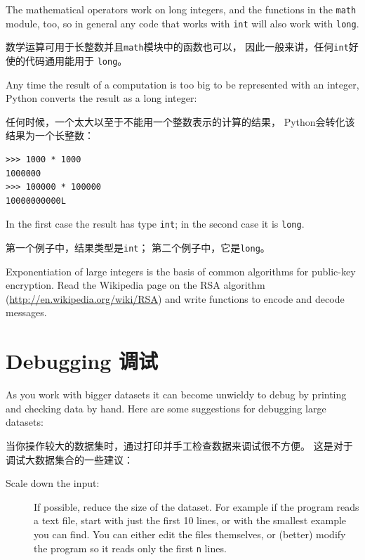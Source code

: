 \documentclass[10pt]{book}
\begin{document}
\begin{CJK}{UTF8}{gbsn}
The mathematical operators work on long integers, and the functions
in the {\tt math} module, too, so in general any code that
works with {\tt int} will also work with {\tt long}.

数学运算可用于长整数并且{\tt math}模块中的函数也可以，
因此一般来讲，任何{\tt int}好使的代码通用能用于 {\tt long}。

Any time the result of a computation is too big to be represented with
an integer, Python converts the result as a long integer:

任何时候，一个太大以至于不能用一个整数表示的计算的结果，
Python会转化该结果为一个长整数：

\begin{verbatim}
>>> 1000 * 1000
1000000
>>> 100000 * 100000
10000000000L
\end{verbatim}
%
In the first case the result has type {\tt int}; in the
second case it is {\tt long}.

第一个例子中，结果类型是{\tt int}；
第二个例子中，它是{\tt long}。

\begin{exercise}

Exponentiation of large integers is the basis of common
algorithms for public-key encryption.  Read the Wikipedia
page on the RSA algorithm (\url{http://en.wikipedia.org/wiki/RSA})
and write functions to encode and decode messages.


\end{exercise}


\section{Debugging 调试}

As you work with bigger datasets it can become unwieldy to
debug by printing and checking data by hand.  Here are some
suggestions for debugging large datasets:

当你操作较大的数据集时，通过打印并手工检查数据来调试很不方便。
这是对于调试大数据集合的一些建议：

\begin{description}

\item[Scale down the input:] If possible, reduce the size of the
dataset.  For example if the program reads a text file, start with
just the first 10 lines, or with the smallest example you can find.
You can either edit the files themselves, or (better) modify the
program so it reads only the first {\tt n} lines.


\end{description}
\end{CJK}
\end{document}
